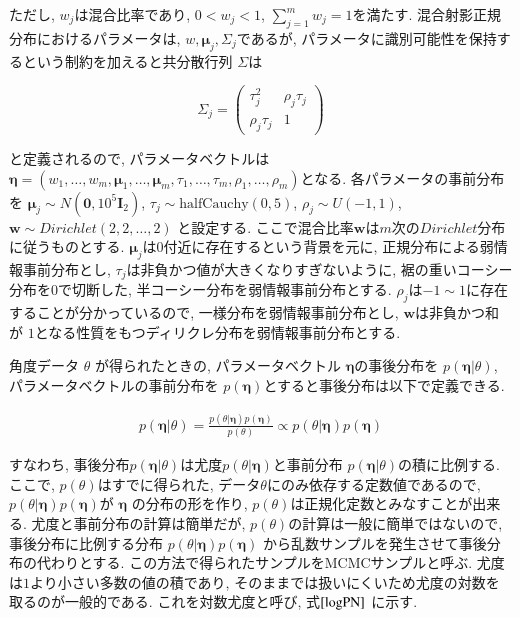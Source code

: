 \documentclass[a4j,11pt]{jarticle}
\begin{document}
\vspace{-1zh}
\noindent
ただし, $w_j$は混合比率であり, $0 < w_j < 1$, $\sum^m_{j=1} w_j = 1$を満たす. 混合射影正規分布におけるパラメータは, $w, \bm \mu_j, \Sigma_j$であるが, パラメータに識別可能性を保持するという制約を加えると共分散行列 $\Sigma$は

\vspace{-1zh}
\[
 \Sigma_j = \left(
    \begin{array}{cc}
      \tau_j^2 & \rho_j \tau_j \\
      \rho_j \tau_j & 1
    \end{array}
  \right)
\]

\vspace{-0.5zh}
\noindent
と定義されるので, パラメータベクトルは$\bm \eta = (w_1, \dots, w_m, \bm \mu_1, \dots, \bm \mu_m, \tau_1, \dots, \tau_m, \rho_1, \dots, \rho_m)$となる. 各パラメータの事前分布を $\bm \mu_j \sim N(\bm 0, 10^5 \bm I_2)$, $\tau_j \sim \mathrm{half Cauchy}(0,5)$, $\rho_j \sim U(-1,1)$, $\bm w \sim Dirichlet(2,2, \dots, 2)$ と設定する. ここで混合比率$\bm w$は$m$次の$Dirichlet$分布に従うものとする. $\bm \mu_j$は$0$付近に存在するという背景を元に, 正規分布による弱情報事前分布とし, $\tau_j$は非負かつ値が大きくなりすぎないように, 裾の重いコーシー分布を$0$で切断した, 半コーシー分布を弱情報事前分布とする. $\rho_j$は$-1 \sim 1$に存在することが分かっているので, 一様分布を弱情報事前分布とし, $\bm w$は非負かつ和が $1$となる性質をもつディリクレ分布を弱情報事前分布とする.

角度データ $\theta$ が得られたときの, パラメータベクトル $\bm \eta$の事後分布を $p(\bm \eta| \theta)$, パラメータベクトルの事前分布を $p(\bm \eta)$とすると事後分布は以下で定義できる. 

\vspace{-1zh}
\begin{eqnarray*}
p(\bm \eta | \theta) = \frac{p(\theta | \bm \eta) p(\bm \eta)}{p(\theta)} \propto p(\theta | \bm \eta) p(\bm \eta)
\end{eqnarray*}

\vspace{-0.5zh}
\noindent
すなわち, 事後分布$p(\bm \eta | \theta)$は尤度$p(\theta | \bm \eta)$と事前分布 $p(\bm \eta| \theta)$の積に比例する. ここで, $p(\theta)$はすでに得られた, データ$\theta$にのみ依存する定数値であるので, $p(\theta | \bm \eta) p(\bm \eta)$が $\bm \eta$ の分布の形を作り, $p(\theta)$は正規化定数とみなすことが出来る. 尤度と事前分布の計算は簡単だが, $p(\theta)$の計算は一般に簡単ではないので, 事後分布に比例する分布 $p(\theta | \bm \eta) p(\bm \eta)$ から乱数サンプルを発生させて事後分布の代わりとする. この方法で得られたサンプルをMCMCサンプルと呼ぶ. 尤度は$1$より小さい多数の値の積であり, そのままでは扱いにくいため尤度の対数を取るのが一般的である. これを対数尤度と呼び, 式$\ref{logPN}$ に示す. 
\end{document}
